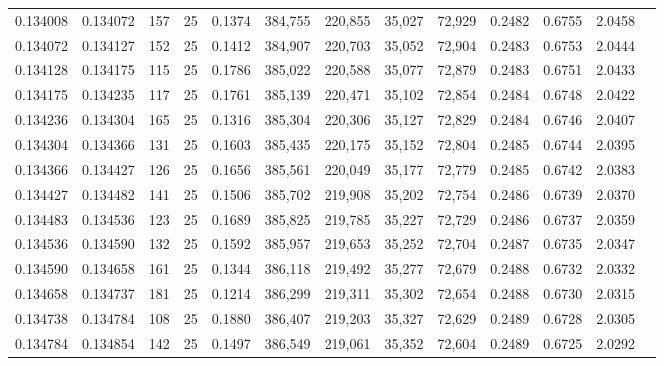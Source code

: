 \begin{tabular}{rrrrrrrrrrrrr}
0.134008 & 0.134072 &   157 &  25 &                                     0.1374 & 384,755 & 220,855 &  35,027 &  72,929 & 0.2482 & 0.6755 & 2.0458 \\
0.134072 & 0.134127 &   152 &  25 &                                     0.1412 & 384,907 & 220,703 &  35,052 &  72,904 & 0.2483 & 0.6753 & 2.0444 \\
0.134128 & 0.134175 &   115 &  25 &                                     0.1786 & 385,022 & 220,588 &  35,077 &  72,879 & 0.2483 & 0.6751 & 2.0433 \\
0.134175 & 0.134235 &   117 &  25 &                                     0.1761 & 385,139 & 220,471 &  35,102 &  72,854 & 0.2484 & 0.6748 & 2.0422 \\
0.134236 & 0.134304 &   165 &  25 &                                     0.1316 & 385,304 & 220,306 &  35,127 &  72,829 & 0.2484 & 0.6746 & 2.0407 \\
0.134304 & 0.134366 &   131 &  25 &                                     0.1603 & 385,435 & 220,175 &  35,152 &  72,804 & 0.2485 & 0.6744 & 2.0395 \\
0.134366 & 0.134427 &   126 &  25 &                                     0.1656 & 385,561 & 220,049 &  35,177 &  72,779 & 0.2485 & 0.6742 & 2.0383 \\
0.134427 & 0.134482 &   141 &  25 &                                     0.1506 & 385,702 & 219,908 &  35,202 &  72,754 & 0.2486 & 0.6739 & 2.0370 \\
0.134483 & 0.134536 &   123 &  25 &                                     0.1689 & 385,825 & 219,785 &  35,227 &  72,729 & 0.2486 & 0.6737 & 2.0359 \\
0.134536 & 0.134590 &   132 &  25 &                                     0.1592 & 385,957 & 219,653 &  35,252 &  72,704 & 0.2487 & 0.6735 & 2.0347 \\
0.134590 & 0.134658 &   161 &  25 &                                     0.1344 & 386,118 & 219,492 &  35,277 &  72,679 & 0.2488 & 0.6732 & 2.0332 \\
0.134658 & 0.134737 &   181 &  25 &                                     0.1214 & 386,299 & 219,311 &  35,302 &  72,654 & 0.2488 & 0.6730 & 2.0315 \\
0.134738 & 0.134784 &   108 &  25 &                                     0.1880 & 386,407 & 219,203 &  35,327 &  72,629 & 0.2489 & 0.6728 & 2.0305 \\
0.134784 & 0.134854 &   142 &  25 &                                     0.1497 & 386,549 & 219,061 &  35,352 &  72,604 & 0.2489 & 0.6725 & 2.0292 \\

\end{tabular}
